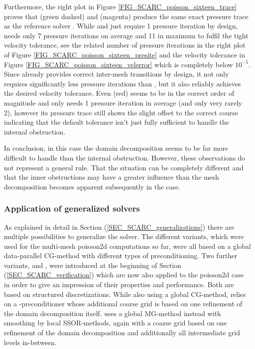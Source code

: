 Furthermore, the right plot in Figure \ref{FIG_SCARC_poisson_sixteen_trace} proves that \uscarc{} (green dashed) and \scarctight{} (magenta) produce the same exact pressure trace as the reference solver \uglmat{}. While \uglmat{} and \uscarc{} just require 1 pressure iteration by design, \scarctight{} needs only 7 pressure iterations on average and 11 in maximum to fulfil the tight velocity tolerance, see the related number of pressure iterations in the right plot of Figure \ref{FIG_SCARC_poisson_sixteen_presite} and the  velocity tolerance  in Figure \ref{FIG_SCARC_poisson_sixteen_velerror} which is completely below $10^{-5}$.
%
Since \scarctight{} already provides correct inter-mesh transitions by design, it not only requires significantly less pressure iterations than \ffttight{}, but it also reliably achieves the desired velocity tolerance.
Even \scarcdefault{} (red) seems to be in the correct order of magnitude and only needs 1 pressure iteration in average (and only very rarely 2), however its pressure trace still shows the slight offset to the correct course indicating that the default tolerance isn't just fully sufficient to handle the internal obstruction.

In conclusion, in this case the domain decomposition seems to be far more difficult to handle than the internal obstruction.
However, these observations do not represent a general rule. That the situation can be completely different and that the inner obstructions may have a greater influence than the mesh decomposition becomes apparent subsequently in the {} case.


\subsubsection{Application of generalized \scarc{} solvers}
\label{SEC_SCARC_poisson_generalizations}

As explained in detail in Section (\ref{SEC_SCARC_generalizations}) there are multiple possibilities to generalize the \scarc{} solver. 
The different \scarc{} variants, which were used for the multi-mesh {\ct poisson2d} computations so far, were all 
based on a global data-parallel CG-method with different types of preconditioning. 
Two further variants, \scarctwolevel{} and \scarcmultigrid{}, were introduced at the beginning of Section (\ref{SEC_SCARC_verification})
which are now also applied to the {\ct poisson2d} case in order to give an impression of their properties and performance. 
Both are based on structured discretizations. While also using a global CG-method, \scarctwolevel{} relies on a \tls{}-preconditioner whose additional coarse grid is based on one refinement of the domain decomposition itself. \scarcmultigrid{} uses a global MG-method instead with smoothing by local SSOR-methods, again with a coarse grid based on one refinement of the domain decomposition and additionally all intermediate grid levels in-between.


